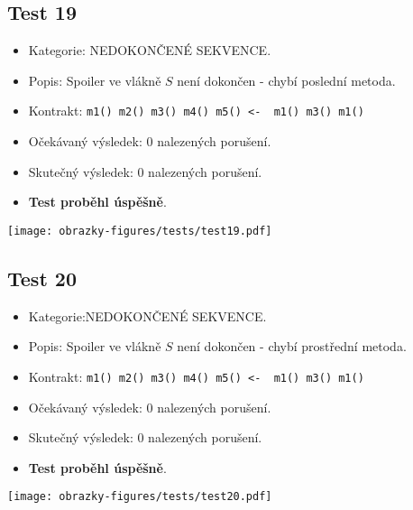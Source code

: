\subsection*{Test 19}
\begin{itemize}
\item Kategorie: NEDOKONČENÉ SEKVENCE.
\item Popis: Spoiler ve vlákně $S$ není dokončen - chybí poslední metoda.
\item Kontrakt: \texttt{m1() m2() m3() m4() m5() <- { m1() m3() m1()}}
\item Očekávaný výsledek: 0 nalezených porušení.
\item Skutečný výsledek: 0 nalezených porušení.

\item \textbf{Test proběhl úspěšně}.
\end{itemize}
\begin{center}
    \centering
    \texttt{[image: obrazky-figures/tests/test19.pdf]}
    \label{test19}
\end{center}
\subsection*{Test 20}
\begin{itemize}
\item Kategorie:NEDOKONČENÉ SEKVENCE.
\item Popis: Spoiler ve vlákně $S$ není dokončen - chybí prostřední metoda.
\item Kontrakt: \texttt{m1() m2() m3() m4() m5() <- { m1() m3() m1()}}
\item Očekávaný výsledek: 0 nalezených porušení.
\item Skutečný výsledek: 0 nalezených porušení.

\item \textbf{Test proběhl úspěšně}.
\end{itemize}
\begin{center}
    \centering
    \texttt{[image: obrazky-figures/tests/test20.pdf]}
    \label{test20}
\end{center}

